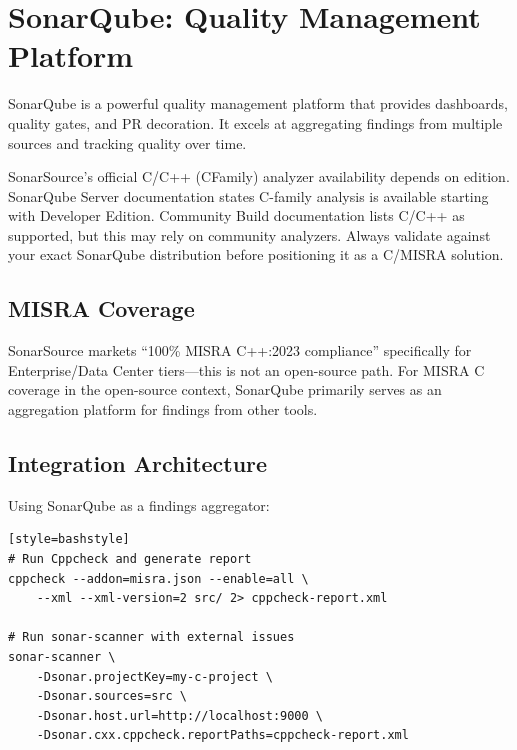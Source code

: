 \documentclass[11pt,letterpaper]{report}
\begin{document}
\section{SonarQube: Quality Management Platform}

SonarQube is a powerful quality management platform that provides dashboards, quality gates, and PR decoration. It excels at aggregating findings from multiple sources and tracking quality over time.

\begin{notebox}
SonarSource's official C/C++ (CFamily) analyzer availability depends on edition. SonarQube Server documentation states C-family analysis is available starting with Developer Edition. Community Build documentation lists C/C++ as supported, but this may rely on community analyzers. Always validate against your exact SonarQube distribution before positioning it as a C/MISRA solution.
\end{notebox}

\subsection{MISRA Coverage}

SonarSource markets ``100\% MISRA C++:2023 compliance'' specifically for Enterprise/Data Center tiers---this is not an open-source path. For MISRA C coverage in the open-source context, SonarQube primarily serves as an aggregation platform for findings from other tools.

\subsection{Integration Architecture}

Using SonarQube as a findings aggregator:

\begin{verbatim}[style=bashstyle]
# Run Cppcheck and generate report
cppcheck --addon=misra.json --enable=all \
    --xml --xml-version=2 src/ 2> cppcheck-report.xml

# Run sonar-scanner with external issues
sonar-scanner \
    -Dsonar.projectKey=my-c-project \
    -Dsonar.sources=src \
    -Dsonar.host.url=http://localhost:9000 \
    -Dsonar.cxx.cppcheck.reportPaths=cppcheck-report.xml
\end{verbatim}

\end{document}
